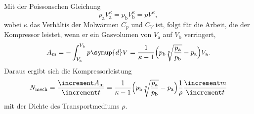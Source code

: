 Mit der Poissonschen Gleichung
\begin{equation}
  p_\text{a}V_\text{a}^\kappa = p_\text{b}V_\text{b}^\kappa = pV^\kappa,
  \label{eqn:Poisson}
\end{equation}
wobei $\kappa$ das Verhältis der Molwärmen $C_p$ und $C_V$ ist,
folgt für die Arbeit, die der Kompressor leistet, wenn er ein Gasvolumen von
$V_\text{a}$ auf $V_\text{b}$ verringert,
\begin{equation}
  A_\text{m} = - \int_{V_\text{a}}^{V_\text{b}} p \symup{d}V =
  \frac{1}{\kappa - 1} \Bigl(p_\text{b} \sqrt[\kappa]{\frac{p_\text{a}}
  {p_\text{b}}} - p_\text{a} \Bigr) V_\text{a}.
\end{equation}
Daraus ergibt sich die Kompressorleistung
\begin{equation}
  N_\text{mech} = \frac{\increment A_\text{m}}{\increment t} =
  \frac{1}{\kappa - 1} \Bigl(p_\text{b} \sqrt[\kappa]{\frac{p_\text{a}}
  {p_\text{b}}} - p_\text{a} \Bigr) \frac{1}{\rho} \frac{\increment m}
  {\increment t}
  \label{eqn:mechaleist}
\end{equation}
mit der Dichte des Transportmediums $\rho$.
